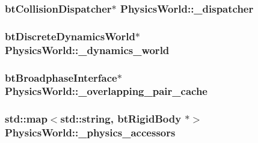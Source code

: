 \subsubsection[{\texorpdfstring{\+\_\+dispatcher}{_dispatcher}}]{\setlength{\rightskip}{0pt plus 5cm}bt\+Collision\+Dispatcher$\ast$ Physics\+World\+::\+\_\+dispatcher\hspace{0.3cm}{\ttfamily [private]}}\hypertarget{classPhysicsWorld_a9b93b53057204efcf09360d52f0c9abf}{}\label{classPhysicsWorld_a9b93b53057204efcf09360d52f0c9abf}
\subsubsection[{\texorpdfstring{\+\_\+dynamics\+\_\+world}{_dynamics_world}}]{\setlength{\rightskip}{0pt plus 5cm}bt\+Discrete\+Dynamics\+World$\ast$ Physics\+World\+::\+\_\+dynamics\+\_\+world\hspace{0.3cm}{\ttfamily [private]}}\hypertarget{classPhysicsWorld_aceb2c8cc42941a57001748d7ebb14369}{}\label{classPhysicsWorld_aceb2c8cc42941a57001748d7ebb14369}
\subsubsection[{\texorpdfstring{\+\_\+overlapping\+\_\+pair\+\_\+cache}{_overlapping_pair_cache}}]{\setlength{\rightskip}{0pt plus 5cm}bt\+Broadphase\+Interface$\ast$ Physics\+World\+::\+\_\+overlapping\+\_\+pair\+\_\+cache\hspace{0.3cm}{\ttfamily [private]}}\hypertarget{classPhysicsWorld_ac48644ac2479eeecc2eb7b856ea182cb}{}\label{classPhysicsWorld_ac48644ac2479eeecc2eb7b856ea182cb}
\subsubsection[{\texorpdfstring{\+\_\+physics\+\_\+accessors}{_physics_accessors}}]{\setlength{\rightskip}{0pt plus 5cm}std\+::map$<$std\+::string, bt\+Rigid\+Body $\ast$$>$ Physics\+World\+::\+\_\+physics\+\_\+accessors\hspace{0.3cm}{\ttfamily [private]}}\hypertarget{classPhysicsWorld_a5919c56a382a1376151b5bd8da32e033}{}\label{classPhysicsWorld_a5919c56a382a1376151b5bd8da32e033}
